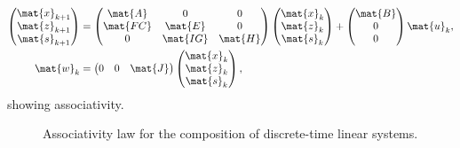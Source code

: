 \begin{equation*}
    \label{eq:dlin-7}
    \begin{aligned}
        \begin{pmatrix}
            \mat{x}_{k+1} \\
            \mat{z}_{k+1} \\
            \mat{s}_{k+1}
        \end{pmatrix}&=
        \begin{pmatrix}
            \mat{A}  & 0        & 0       \\
            \mat{FC} & \mat{E}  & 0       \\
            0        & \mat{IG} & \mat{H}
        \end{pmatrix}\begin{pmatrix}
                         \mat{x}_k\\ \mat{z}_k\\ \mat{s}_k
        \end{pmatrix}+
        \begin{pmatrix}
            \mat{B}\\ 0\\ 0
        \end{pmatrix}\mat{u}_k,\\
        \mat{w}_k&=\begin{pmatrix}
                       0& 0& \mat{J}
        \end{pmatrix}\begin{pmatrix}
                         \mat{x}_k\\ \mat{z}_k\\ \mat{s}_k
        \end{pmatrix},
    \end{aligned}
\end{equation*}
showing associativity.

\begin{figure}[tbh]
    \centering
    \prflinepadbefore=5pt
    \prflinepadafter=5pt
    {
    }
    \caption{Associativity law for the composition of discrete-time linear systems. }
    \label{fig:ass_dyn_syst}
\end{figure}

